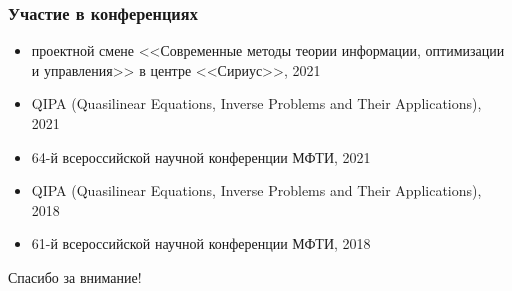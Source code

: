 \begin{frame}
    \frametitle{Участие в конференциях}
    \begin{itemize}
        \item проектной смене <<Современные методы теории информации, оптимизации и управления>> в центре <<Сириус>>, 2021
        \item QIPA (Quasilinear Equations, Inverse Problems and Their Applications), 2021
        \item 64-й всероссийской научной конференции МФТИ, 2021
        \item QIPA (Quasilinear Equations, Inverse Problems and Their Applications), 2018
        \item 61-й всероссийской научной конференции МФТИ, 2018
    \end{itemize}
\end{frame}

\begin{frame} %
    \begin{center}
        \Huge
        Спасибо за внимание!
    \end{center}
\end{frame}

